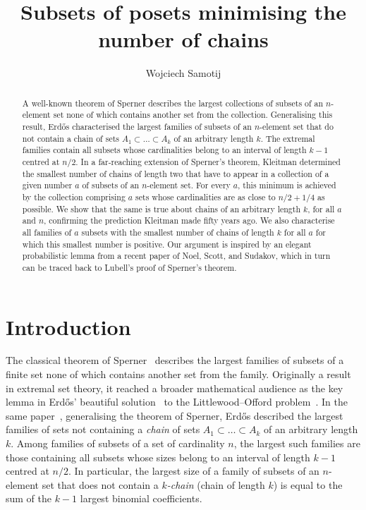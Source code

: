 \documentclass[11pt,a4paper,reqno]{amsart}
\title{Subsets of posets minimising the number of chains}
\author{Wojciech Samotij}
\numberwithin{claim}{thm}
\theoremstyle{definition}
\begin{document}
\maketitle

\begin{abstract}
  A well-known theorem of Sperner describes the largest collections of subsets of an $n$-element set none of which contains another set from the collection. Generalising this result, Erd\H{o}s characterised the largest families of subsets of an $n$-element set that do not contain a chain of sets $A_1 \subset \dotsc \subset A_k$ of an arbitrary length $k$. The extremal families contain all subsets whose cardinalities belong to an interval of length $k-1$ centred at $n/2$. In a far-reaching extension of Sperner's theorem, Kleitman determined the smallest number of chains of length two that have to appear in a collection of a given number $a$ of subsets of an $n$-element set. For every $a$, this minimum is achieved by the collection comprising $a$ sets whose cardinalities are as close to $n/2+1/4$ as possible. We show that the same is true about chains of an arbitrary length $k$, for all $a$ and $n$, confirming the prediction Kleitman made fifty years ago. We also characterise all families of $a$ subsets with the smallest number of chains of length $k$ for all $a$ for which this smallest number is positive. Our argument is inspired by an elegant probabilistic lemma from a recent paper of Noel, Scott, and Sudakov, which in turn can be traced back to Lubell's proof of Sperner's theorem.
\end{abstract}

\section{Introduction}
\label{sec:introduction}

The classical theorem of Sperner~\cite{Sp28} describes the largest families of subsets of a finite set none of which contains another set from the family. Originally a result in extremal set theory, it reached a broader mathematical audience as the key lemma in Erd\H{o}s' beautiful solution~\cite{Er45} to the Littlewood--Offord problem~\cite{LiOf43}. In the same paper~\cite{Er45}, generalising the theorem of Sperner, Erd\H{o}s described the largest families of sets not containing a \emph{chain} of sets $A_1 \subset \dotsc \subset A_k$ of an arbitrary length $k$. Among families of subsets of a set of cardinality $n$, the largest such families are those containing all subsets whose sizes belong to an interval of length $k-1$ centred at $n/2$. In particular, the largest size of a family of subsets of an $n$-element set that does not contain a \emph{$k$-chain} (chain of length $k$) is equal to the sum of the $k-1$ largest binomial coefficients.
\end{document}
